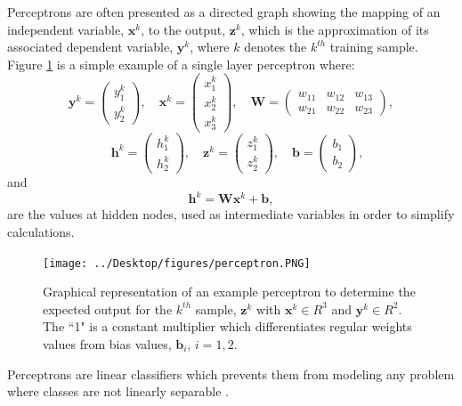 \documentclass[letterpaper,12pt,titlepage,oneside,final]{book}
\begin{document}
	Perceptrons are often presented as a directed graph showing the mapping of an independent variable, $\mathbf{x}^{k}$, to the output, $\mathbf{z}^{k}$, which is the approximation of its associated dependent variable, $\mathbf{y}^{k}$, where $k$ denotes the $k^{th}$ training sample. Figure \ref{perceptron} is a simple example of a single layer perceptron where:
	\begin{equation}
	\mathbf{y}^{k} = 
	\begin{pmatrix}
	y_{1}^{k}\\ 
	y_{2}^{k}
	\end{pmatrix},
	\quad \mathbf{x}^{k} = 
	\begin{pmatrix}
	x_{1}^{k}\\ 
	x_{2}^{k}\\
	x_{3}^{k}
	\end{pmatrix},
	\quad \mathbf{W} = 
	\begin{pmatrix}
	w_{11} & w_{12} & w_{13} \\ 
	w_{21} & w_{22} & w_{23}
	\end{pmatrix},
	\end{equation}
	\begin{equation}
	\quad \mathbf{h}^{k} = 
	\begin{pmatrix}
	h_{1}^{k}\\ 
	h_{2}^{k}
	\end{pmatrix},
	\quad \mathbf{z}^{k} = 
	\begin{pmatrix}
	z_{1}^{k}\\ 
	z_{2}^{k}
	\end{pmatrix},
	\quad \mathbf{b} = 
	\begin{pmatrix}
	b_{1}\\ 
	b_{2}
	\end{pmatrix},
	\end{equation}
	and 
	\begin{equation}
	\mathbf{h}^{k} = \mathbf{W}\mathbf{x}^{k} + \mathbf{b},
	\end{equation}
	are the values at hidden nodes, used as intermediate variables in order to simplify calculations. 
	\begin{figure}[h]
		\centering
		\texttt{[image: ../Desktop/figures/perceptron.PNG]}
		\caption{Graphical representation of an example perceptron to determine the expected output for the $k^{th}$ sample, $\mathbf{z}^{k}$ with $\mathbf{x}^{k} 
			\in R^{3}$ and $\mathbf{y}^{k} \in R^{2}$. The ``1" is a constant multiplier which differentiates regular weights values from bias values, $\mathbf{b}_{i}$, $i=1,2$.}
		\label{perceptron}
	\end{figure}
	Perceptrons are linear classifiers which prevents them from modeling any problem where classes are not linearly separable \cite{Shepherd.1997}.  
	
\end{document}
